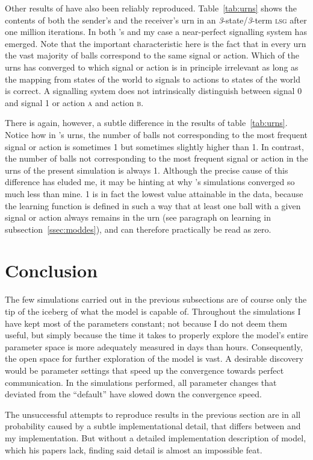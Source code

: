 \documentclass[
	DIV=calc,
	BCOR=0mm,
	pagesize,
]{scrartcl}
\newcommand{\lsg}{\textsc{lsg}}
\newcommand{\nslsg}[1]{\textit{#1}-state/\textit{#1}-term \lsg}
\begin{document}
Other results of \citet{barrett_numerical_2006} have also been reliably reproduced.
Table~\ref{tab:urns} shows the contents of both the sender's and the receiver's urn in an \nslsg{3} after one million iterations.
In both \citeauthor{barrett_numerical_2006}'s and my case a near-perfect signalling system has emerged.
Note that the important characteristic here is the fact that in every urn the vast majority of balls correspond to the same signal or action.
Which of the urns has converged to which signal or action is in principle irrelevant as long as the mapping from states of the world to signals to actions to states of the world is correct.
A signalling system does not intrinsically distinguish between signal 0 and signal 1 or action \textsc{a} and action \textsc{b}.

There is again, however, a subtle difference in the results of table~\ref{tab:urns}.
Notice how in \citeauthor{barrett_numerical_2006}'s urns, the number of balls not corresponding to the most frequent signal or action is sometimes 1 but sometimes slightly higher than 1.
In contrast, the number of balls not corresponding to the most frequent signal or action in the urns of the present simulation is always 1.
Although the precise cause of this difference has eluded me, it may be hinting at why \citeauthor{barrett_numerical_2006}'s simulations converged so much less than mine.
1 is in fact the lowest value attainable in the data, because the learning function is defined in such a way that at least one ball with a given signal or action always remains in the urn (see paragraph on learning in subsection~\ref{ssec:moddes}), and can therefore practically be read as zero.

\section{Conclusion}
\label{ssec:rescon}
The few simulations carried out in the previous subsections are of course only the tip of the iceberg of what the model is capable of.
Throughout the simulations I have kept most of the parameters constant; not because I do not deem them useful, but simply because the time it takes to properly explore the model's entire parameter space is more adequately measured in days than hours.
Consequently, the open space for further exploration of the model is vast.
A desirable discovery would be parameter settings that speed up the convergence towards perfect communication.
In the simulations performed, all parameter changes that deviated from the ``default'' have slowed down the convergence speed.

The unsuccessful attempts to reproduce results in the previous section are in all probability caused by a subtle implementational detail, that differs between  and my implementation.
But without a detailed implementation description of  model, which his papers lack, finding said detail is almost an impossible feat.

\newpage%
\end{document}
